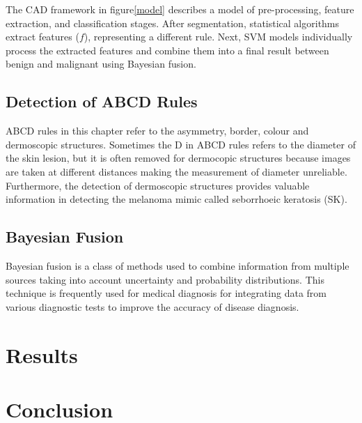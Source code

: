 The CAD framework in figure\ref{model} describes a model of pre-processing, feature extraction, and classification stages. After segmentation, statistical algorithms extract features ($f$), representing a different rule. Next, SVM models individually process the extracted features and combine them into a final result between benign and malignant using Bayesian fusion.



\subsection{Detection of ABCD Rules}
ABCD rules in this chapter refer to the asymmetry, border, colour and dermoscopic structures. Sometimes the D in ABCD rules refers to the diameter of the skin lesion, but it is often removed for dermocopic structures because images are taken at different distances making the measurement of diameter unreliable. Furthermore, the detection of dermoscopic structures provides valuable information in detecting the melanoma mimic called seborrhoeic keratosis (SK)\cite{Minagawa2017}. 

\subsection{Bayesian Fusion}
Bayesian fusion is a class of methods used to combine information from multiple sources taking into account uncertainty and probability distributions. This technique is frequently used for medical diagnosis for integrating data from various diagnostic tests to improve the accuracy of disease diagnosis\cite{}.





\section{Results}

\section{Conclusion}
